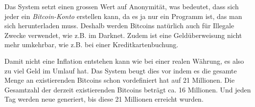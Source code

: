 \noindent
Das System setzt einen grossen Wert auf Anonymität, was bedeutet, dass sich jeder ein \emph{\dq Bitcoin-Konto \dq} erstellen kann, da es ja nur ein
Programm ist, das man sich herunterladen muss. Deshalb werden Bitcoins natürlich auch für Illegale Zwecke verwendet, wie z.B. im Darknet. Zudem ist eine
Geldüberweisung nicht mehr umkehrbar, wie z.B. bei einer Kreditkartenbuchung.

\noindent
Damit nicht eine Inflation entstehen kann wie bei einer realen Währung, es also zu viel Geld im Umlauf hat. Das System beugt dies vor indem es die gesamte Menge
an existierenden Bitcoins schon vordefiniert hat auf 21 Millionen. Die Gesamtzahl der derzeit existierenden Bitcoins beträgt ca. 16 Millionen. Und jeden Tag werden
neue generiert, bis diese 21 Millionen erreicht wurden.
